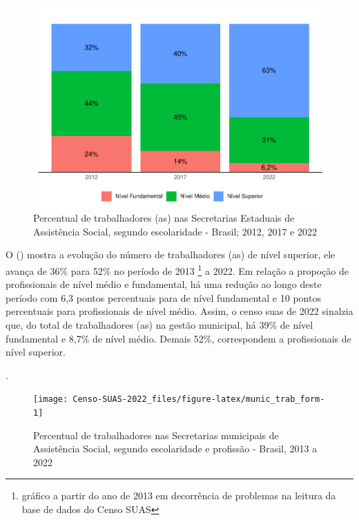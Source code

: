 \documentclass[
  brazilian]{report}
\begin{document}
\begin{figure}
\includegraphics{Censo-SUAS-2022_files/figure-latex/uf_trab_form-1} \caption[Percentual de trabalhadores (as) nas Secretarias Estaduais de Assistência Social, segundo escolaridade - Brasil]{Percentual de trabalhadores (as) nas Secretarias Estaduais de Assistência Social, segundo escolaridade - Brasil; 2012, 2017 e 2022}\label{fig:uf_trab_form}
\end{figure}

O () mostra a evolução do número de
trabalhadores (as) de nível superior, ele avança de 36\% para 52\% no
período de 2013
\footnote{gráfico a partir do ano de 2013 em decorrência de problemas na leitura da base de dados do Censo SUAS}
a 2022. Em relação a propoção de profissionais de nível médio e
fundamental, há uma redução ao longo deste período com 6,3 pontos
percentuais para de nível fundamental e 10 pontos percentuais para
profissionais de nível médio. Assim, o censo suas de 2022 sinalzia que,
do total de trabalhadores (as) na gestão municipal, há 39\% de nível
fundamental e 8,7\% de nível médio. Demais 52\%, correspondem a
profissionais de nível superior.

.

\begin{figure}
\texttt{[image: Censo-SUAS-2022\_files/figure-latex/munic\_trab\_form-1]} \caption[ Percentual de trabalhadores nas Secretarias municipais de Assistência Social, segundo escolaridade e profissão - Brasil, 2013 a 2022]{ Percentual de trabalhadores nas Secretarias municipais de Assistência Social, segundo escolaridade e profissão - Brasil, 2013 a 2022}\label{fig:munic_trab_form}
\end{figure}
\end{document}
